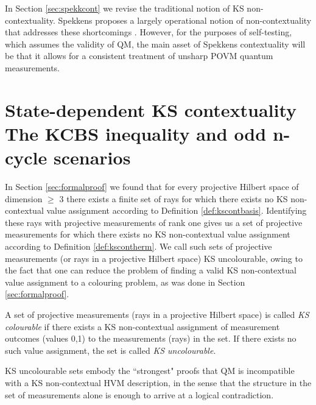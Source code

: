 In Section \ref{sec:spekkcont} we revise the traditional notion of KS non-contextuality. Spekkens proposes a largely operational notion of non-contextuality that addresses these shortcomings \cite{Spekkens2005}. However, for the purposes of self-testing, which assumes the validity of QM, the main asset of Spekkens contextuality will be that it allows for a consistent treatment of unsharp POVM quantum measurements.

\section[State-dependent KS contextuality\\ The KCBS inequality and odd n-cycle scenarios]{State-dependent KS contextuality \\ \large{The KCBS inequality and odd n-cycle scenarios}}
\label{sec:kcbs}
In Section \ref{sec:formalproof} we found that for every projective Hilbert space of dimension $\geq$ 3 there exists a finite set of rays for which there exists no KS non-contextual value assignment according to Definition \ref{def:kscontbasis}. Identifying these rays with projective measurements of rank one gives us a set of projective measurements for which there exists no KS non-contextual value assignment according to Definition \ref{def:kscontherm}. We call such sets of projective measurements (or rays in a projective Hilbert space) KS uncolourable, owing to the fact that one can reduce the problem of finding a valid KS non-contextual value assignment to a colouring problem, as was done in Section \ref{sec:formalproof}. 
\begin{definition}
A set of projective measurements (rays in a projective Hilbert space) is called \emph{KS colourable} if there exists a KS non-contextual assignment of measurement outcomes (values 0,1) to the measurements (rays) in the set. If there exists no such value assignment, the set is called \emph{KS uncolourable}.
\end{definition}
KS uncolourable sets embody the ``strongest" proofs that QM is incompatible with a KS non-contextual HVM description, in the sense that the structure in the set of measurements alone is enough to arrive at a logical contradiction.
